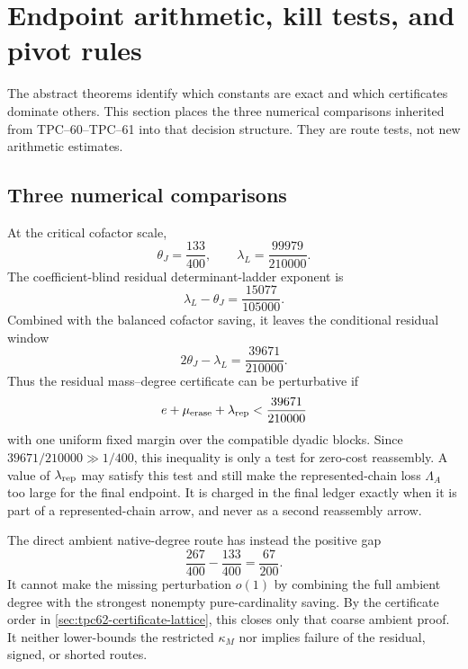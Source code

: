 \section{Endpoint arithmetic, kill tests, and pivot rules}
\label{sec:tpc62-endpoint-decisions}

The abstract theorems identify which constants are exact and which
certificates dominate others.  This section places the three numerical
comparisons inherited from TPC--60--TPC--61 into that decision structure.
They are route tests, not new arithmetic estimates.

\subsection{Three numerical comparisons}

At the critical cofactor scale,
\begin{equation}
 \theta_J=\frac{133}{400},
 \qquad
 \lambda_L=\frac{99979}{210000}.
 \label{eq:tpc62-endpoint-basic-exponents}
\end{equation}
The coefficient-blind residual determinant-ladder exponent is
\begin{equation}
 \lambda_L-\theta_J
 =\frac{15077}{105000}.
 \label{eq:tpc62-endpoint-residual-degree}
\end{equation}
Combined with the balanced cofactor saving, it leaves the conditional
residual window
\begin{equation}
 \boxed{
 2\theta_J-\lambda_L
 =\frac{39671}{210000}.}
 \label{eq:tpc62-endpoint-residual-window}
\end{equation}
Thus the residual mass--degree certificate can be perturbative if
\begin{equation}
 e+\mu_{\rm erase}+\lambda_{\rm rep}
 <\frac{39671}{210000}
 \label{eq:tpc62-endpoint-residual-condition}
\end{equation}
with one uniform fixed margin over the compatible dyadic blocks.
Since \(39671/210000\gg1/400\), this inequality is only a test for
zero-cost reassembly.  A value of \(\lambda_{\rm rep}\) may satisfy this
test and still make the represented-chain loss \(\Lambda_A\) too large for
the final endpoint.  It is charged in the final ledger exactly when it is
part of a represented-chain arrow, and never as a second reassembly arrow.

The direct ambient native-degree route has instead the positive gap
\begin{equation}
 \boxed{
 \frac{267}{400}-\frac{133}{400}
 =\frac{67}{200}.}
 \label{eq:tpc62-endpoint-ambient-gap}
\end{equation}
It cannot make the missing perturbation \(o(1)\) by combining the full
ambient degree with the strongest nonempty pure-cardinality saving.  By the
certificate order in \cref{sec:tpc62-certificate-lattice}, this closes only
that coarse ambient proof.  It neither lower-bounds the restricted
\(\kappa_M\) nor implies failure of the residual, signed, or shorted routes.

